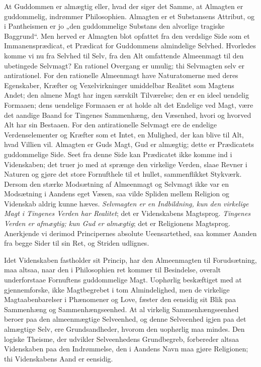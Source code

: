 \documentclass[12pt]{book}
\begin{document}
At Guddommen er almægtig eller, hvad der siger det Samme, at
Almagten er guddommelig, indrømmer Philosophien. Almagten er et
Substansens Attribut, og i Pantheismen er jo „den guddommelige
Substans den alvorlige tragiske Baggrund“. Men herved er Almagten
blot opfattet fra den verdslige Side som et Immanensprædicat, et
Prædicat for Guddommens almindelige Selvhed. Hvorledes komme vi nu
fra Selvhed til Selv, fra den Alt omfattende Almeenmagt til den
ubetingede Selvmagt? En rationel Overgang er umulig; thi Selvmagten
selv er antirationel. For den rationelle Almeenmagt have
Naturatomerne med deres Egenskaber, Kræfter og Vexelvirkninger
umiddelbar Realitet som Magtens Andet; den almene Magt har ingen
særskilt Tilværelse; den er en ideel uendelig Formaaen; dens
uendelige Formaaen er at holde alt det Endelige ved Magt, være det
aandige Baand for Tingenes Sammenhæng, den Væsenhed, hvori og
hvorved Alt har sin Bestaaen. For den antirationelle Selvmagt ere de
endelige Verdenselementer og Kræfter som et Intet, en Mulighed, der
kan blive til Alt, hvad Villien vil. Almagten er Guds Magt, Gud er
almægtig; dette er Prædicatets guddommelige Side. Seet fra denne
Side kan Prædicatet ikke komme ind i Videnskaben; det truer jo med
at sprænge den virkelige Verden, slaae Revner i Naturen og gjøre det
store Fornufthele til et hullet, sammenflikket Stykværk. Dersom den
stærke Modsætning af Almeenmagt og Selvmagt ikke var en Modsætning i
Aandens eget Væsen, saa vilde Spliden mellem Religion og Videnskab
aldrig kunne hæves. \emph{Selvmagten er en Indbildning, kun den
virkelige Magt i Tingenes Verden har Realitet}; det er Videnskabens
Magtsprog. \emph{Tingenes Verden er afmægtig; kun Gud er almægtig};
det er Religionens Magtsprog. Anerkjende vi derimod Principernes
absolute Ueensartethed, saa kommer Aanden fra begge Sider til sin
Ret, og Striden udlignes.

Idet Videnskaben fastholder sit Princip, har den Almeenmagten til
Forudsætning, maa altsaa, naar den i Philosophien ret kommer til
Besindelse, overalt underforstaae Fornuftens guddommelige Magt.
Uophørlig beskæftiget med at gjennemforske, ikke Magtbegrebet i tom
Almindelighed, men de virkelige Magtaabenbarelser i Phænomener og
Love, fæster den eensidig sit Blik paa Sammenhæng og
Sammenhængseenhed. At al virkelig Sammenhængseenhed beroer paa den
almeenmægtige Selveenhed, og denne Selveenhed igjen paa det
almægtige Selv, ere Grundsandheder, hvorom den uophørlig maa mindes.
Den logiske Theisme, der udvikler Selveenhedens Grundbegreb,
forbereder altsaa Videnskaben paa den Indrømmelse, den i Aandens
Navn maa gjøre Religionen; thi Videnskabens Aand er eensidig.
\end{document}
